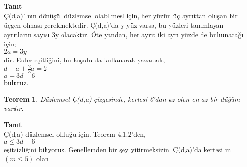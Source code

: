 \documentclass[12 pt]{article}
\newtheorem{definition}{Teorem}[theorem]
\begin{document}
\textbf{Tanıt}\\

Ç(d,a)' nın dönüşül düzlemsel olabilmesi için, her yüzün üç ayrıttan oluşan bir üçgen olması gerekmektedir. Ç(d,a)'da y yüz varsa, bu yüzleri tanımlayan ayrıtların sayısı 3y olacaktır. Öte yandan, her ayrıt iki ayrı yüzde de bulıunacağı için;\\
$ 2a = 3y $\\
dir. Euler eşitliğini, bu koşulu da kullanarak yazarsak,\\

$ \displaystyle d - a + \frac
							{2}{3} 
								  a 
								    = 2 $\\

$ a = 3d - 6 $\\
buluruz. 

\begin{definition}
Düzlemsel Ç(d,a) çizgesinde, kertesi 6'dan az olan en az bir düğüm vardır. 
\end{definition}

\textbf{Tanıt}\\

Ç(d,a) düzlemsel olduğu için, Teorem $ 4.1.2 $'den, \\
$ a 
	\leq 
		3d - 6 $\\
eşitsizliğini biliyoruz. Genellemden bir şey yitirmeksizin, Ç(d,a)'da kertesi m $( m \leq 5 )$ olan 
\end{document}
